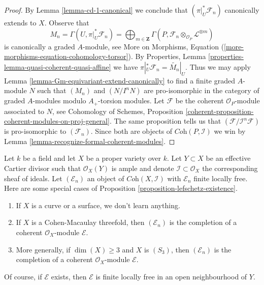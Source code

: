 \begin{proof}
\medskip\noindent
By Lemma \ref{lemma-cd-1-canonical} we conclude that
$(\pi|_U^*\mathcal{F}_n)$ canonically extends to $X$.
Observe that
$$
M_n = \Gamma(U, \pi|_U^*\mathcal{F}_n) =
\bigoplus\nolimits_{m \in \mathbf{Z}}
\Gamma(P, \mathcal{F}_n \otimes_{\mathcal{O}_P} \mathcal{L}^{\otimes m})
$$
is canonically a graded $A$-module, see
More on Morphisms, Equation (\ref{more-morphisms-equation-cohomology-torsor}).
By Properties, Lemma \ref{properties-lemma-quasi-coherent-quasi-affine}
we have $\pi|_U^*\mathcal{F}_n = \widetilde{M_n}|_U$.
Thus we may apply Lemma \ref{lemma-Gm-equivariant-extend-canonically}
to find a finite graded $A$-module $N$ such that
$(M_n)$ and $(N/I^nN)$ are pro-isomorphic in the category
of graded $A$-modules modulo $A_+$-torsion modules.
Let $\mathcal{F}$ be the coherent $\mathcal{O}_P$-module
associated to $N$, see
Cohomology of Schemes, Proposition
\ref{coherent-proposition-coherent-modules-on-proj-general}.
The same proposition tells us that $(\mathcal{F}/\mathcal{I}^n\mathcal{F})$
is pro-isomorphic to $(\mathcal{F}_n)$.
Since both are objects of $\textit{Coh}(P, \mathcal{I})$
we win by Lemma \ref{lemma-recognize-formal-coherent-modules}.
\end{proof}

\begin{example}
\label{example-lefschetz-existence}
Let $k$ be a field and let $X$ be a proper variety over $k$.
Let $Y \subset X$ be an effective Cartier divisor such that
$\mathcal{O}_X(Y)$ is ample and denote
$\mathcal{I} \subset \mathcal{O}_X$ the corresponding
sheaf of ideals. Let $(\mathcal{E}_n)$ an object
of $\textit{Coh}(X, \mathcal{I})$ with $\mathcal{E}_n$
finite locally free.
Here are some special cases of
Proposition \ref{proposition-lefschetz-existence}.
\begin{enumerate}
\item If $X$ is a curve or a surface, we don't learn anything.
\item If $X$ is a Cohen-Macaulay threefold, then
$(\mathcal{E}_n)$ is the completion of a coherent
$\mathcal{O}_X$-module $\mathcal{E}$.
\item More generally, if $\dim(X) \geq 3$ and $X$ is $(S_3)$, then
$(\mathcal{E}_n)$ is the completion of a coherent
$\mathcal{O}_X$-module $\mathcal{E}$.
\end{enumerate}
Of course, if $\mathcal{E}$ exists, then $\mathcal{E}$ is finite locally
free in an open neighbourhood of $Y$.
\end{example}

